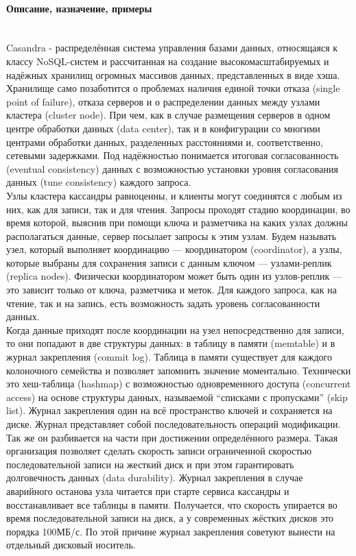 \paragraph{Описание, назначение, примеры}~\\
Casandra - распределённая система управления базами данных, относящаяся к классу NoSQL-систем и рассчитанная на создание высокомасштабируемых и надёжных хранилищ огромных массивов данных, представленных в виде хэша. \\
Хранилище само позаботится о проблемах наличия единой точки отказа (single point of failure), отказа серверов и о распределении данных между узлами кластера (cluster node). При чем, как в случае размещения серверов в одном центре обработки данных (data center), так и в конфигурации со многими центрами обработки данных, разделенных расстояниями и, соответственно, сетевыми задержками. Под надёжностью понимается итоговая согласованность (eventual consistency) данных с возможностью установки уровня согласования данных (tune consistency) каждого запроса. \\
Узлы кластера кассандры равноценны, и клиенты могут соединятся с любым из них, как для записи, так и для чтения. Запросы проходят стадию координации, во время которой, выяснив при помощи ключа и разметчика на каких узлах должны располагаться данные, сервер посылает запросы к этим узлам. Будем называть узел, который выполняет координацию — координатором (coordinator), а узлы, которые выбраны для сохранения записи с данным ключом — узлами-реплик (replica nodes). Физически координатором может быть один из узлов-реплик — это зависит только от ключа, разметчика и меток.
Для каждого запроса, как на чтение, так и на запись, есть возможность задать уровень согласованности данных. \\
Когда данные приходят после координации на узел непосредственно для записи, то они попадают в две структуры данных: в таблицу в памяти (memtable) и в журнал закрепления (commit log). Таблица в памяти существует для каждого колоночного семейства и позволяет запомнить значение моментально. Технически это хеш-таблица (hashmap) с возможностью одновременного доступа (concurrent access) на основе структуры данных, называемой “списками с пропусками” (skip list). Журнал закрепления один на всё пространство ключей и сохраняется на диске. Журнал представляет собой последовательность операций модификации. Так же он разбивается на части при достижении определённого размера.
Такая организация позволяет сделать скорость записи ограниченной скоростью последовательной записи на жесткий диск и при этом гарантировать долговечность данных (data durability). Журнал закрепления в случае аварийного останова узла читается при старте сервиса кассандры и восстанавливает все таблицы в памяти. Получается, что скорость упирается во время последовательной записи на диск, а у современных жёстких дисков это порядка 100МБ/с. По этой причине журнал закрепления советуют вынести на отдельный дисковый носитель.

